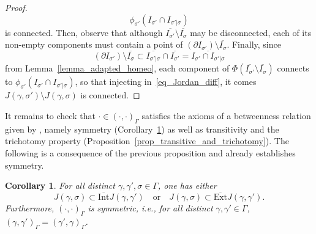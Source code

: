 \documentclass[a4paper, 11pt]{article} %
\theoremstyle{plain}
\newtheorem{corollary}[theorem]{Corollary}
\newcommand{\clInt}{\overline{\mathrm{Int}}}
\newcommand{\clExt}{\overline{\mathrm{Ext}}}
\newcommand{\1}{\mathds 1}
\numberwithin{equation}{section}
\begin{document}
\begin{proof}
        \[\phi_{\sigma'}(I_{\sigma'}\cap I_{\sigma'|\sigma})\]
    is connected. Then, observe that although $\overline{{I_{\sigma'}}}\setminus\overline{I_\sigma}$ may be disconnected, each of its non-empty components must contain a point of $(\partial I_{\sigma'})\setminus\overline{I_\sigma}$. Finally, since
        \[(\partial I_{\sigma'})\setminus\overline{I_\sigma}\subset\overline{I_{\sigma'|\sigma}}\cap \overline{I_{\sigma'}}=\overline{I_{\sigma'}\cap I_{\sigma'|\sigma}}\]
    from Lemma~\ref{lemma_adapted_homeo}, each component of $\Phi(\overline{{I_{\sigma'}}}\setminus\overline{I_\sigma})$ connects to $\phi_{\sigma'}(I_{\sigma'}\cap I_{\sigma'|\sigma})$, so that injecting in~\eqref{eq_Jordan_diff}, it comes $J(\gamma,\sigma')\setminus J(\gamma,\sigma)$ is connected.
\end{proof}


It remains to check that $\cdot\in(\cdot,\cdot)_\Gamma$ satisfies the axioms of a betweenness relation given by \cite{betweenness}, namely symmetry (Corollary~\ref{coro_containment_equiv}) as well as transitivity and the trichotomy property (Proposition~\ref{prop_transitive_and_trichotomy}). The following is a consequence of the previous proposition and already establishes symmetry.


\begin{corollary}
    \label{coro_containment_equiv}
    For all distinct $\gamma,\gamma',\sigma\in\Gamma$, one has either
        \[J(\gamma,\sigma)\subset\clInt J(\gamma, \gamma')\quad\text{or}\quad J(\gamma,\sigma)\subset\clExt J(\gamma,\gamma').\]
    Furthermore, $(\cdot,\cdot)_{\Gamma}$ is \emph{symmetric}, i.e., for all distinct $\gamma,\gamma'\in\Gamma$, $(\gamma,\gamma')_\Gamma=(\gamma',\gamma)_\Gamma$.
\end{corollary}
\end{document}
